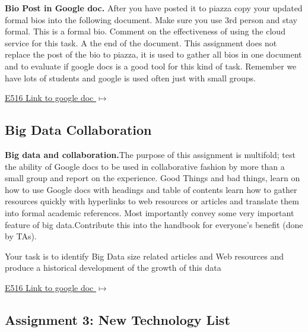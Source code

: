 \begin{exercise} \label{E:bio-googledocs}

 {\bf Bio Post in Google doc.} After you have posted it to piazza copy your updated formal bios into the following document.  Make sure you use 3rd person and stay formal. This is a formal bio. Comment on the effectiveness of using the cloud service for this task. A the end of the document. This assignment does not replace the post of the bio to piazza, it is used to gather all bios in one document and to evaluate if google docs is a good tool for this kind of task. Remember we have lots of students and google is used often just with small groups.
 
 \smallskip

 {\hfill \href{https://docs.google.com/document/d/1ejzlKYqC3dLac8WXVpcPQsJh1j4BDqRxxgGg1cFQbeQ/edit?usp=sharing}{E516 Link to google doc $\mapsto$}}

 \end{exercise}

\subsection{Big Data Collaboration}

\begin{exercise} \label{E:big-data-and-collaboration}
{\bf Big data and collaboration.}The purpose of this assignment is multifold; test the ability of Google docs to be used in collaborative fashion by more than a small group and report on the experience. Good Things and bad things, learn on how to use Google docs with headings and table of contents learn how to gather resources quickly with hyperlinks to web resources or articles and translate them into formal academic references. Most importantly convey some very important feature of big data.Contribute this into the handbook for everyone's benefit (done by TAs).
\smallskip

 Your task is to identify Big Data size related articles and Web resources and produce a historical development of the growth of this data

  {\hfill \href{https://docs.google.com/document/d/1ZHNdhX_Jx7uBQo0kthSYQ6TQR8_KNbgOwH2EuqBQcjY/edit?usp=sharing}{E516 Link to google doc $\mapsto$}}



\end{exercise}



\subsection*{Assignment 3: New Technology List}

